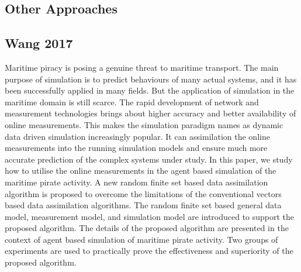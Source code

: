 \subsection{Other Approaches}\label{sub:lit_rev:da_abm:other}

\subsection{Wang 2017}

Maritime piracy is posing a genuine threat to maritime transport.
The main purpose of simulation is to predict behaviours of many actual systems,
and it has been successfully applied in many fields.
But the application of simulation in the maritime domain is still scarce.
The rapid development of network and measurement technologies brings about
higher accuracy and better availability of online measurements.
This makes the simulation paradigm names as dynamic data driven simulation
increasingly popular.
It can assimilation the online measurements into the running simulation models
and ensure much more accurate prediction of the complex systems under study.
In this paper, we study how to utilise the online measurements in the agent
based simulation of the maritime pirate activity.
A new random finite set based data assimilation algorithm is proposed to
overcome the limitations of the conventional vectors based data assimilation
algorithms.
The random finite set based general data model, measurement model, and
simulation model are introduced to support the proposed algorithm.
The details of the proposed algorithm are presented in the context of agent
based simulation of maritime pirate activity.
Two groups of experiments are used to practically prove the effectiveness and
superiority of the proposed algorithm.


